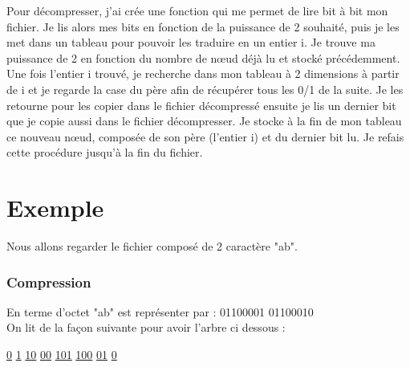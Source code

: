 \documentclass{report}
\begin{document}
Pour décompresser, j'ai crée une fonction qui me permet de lire bit à bit mon fichier. Je lis alors mes bits en fonction de la puissance de 2 souhaité, puis je les met dans un tableau pour pouvoir les traduire en un entier i. 
Je trouve ma puissance de 2 en fonction du nombre de nœud déjà lu et stocké précédemment.
Une fois l'entier i  trouvé, je recherche dans mon tableau à 2 dimensions à partir de i et je regarde la case du père afin de récupérer tous les 0/1 de la suite. Je les retourne pour les copier dans le fichier décompressé ensuite je lis un dernier bit que je copie aussi dans le fichier décompresser.
Je stocke à la fin de mon tableau ce nouveau nœud, composée de son père (l'entier i) et du dernier bit lu. 
Je refais cette procédure jusqu'à la fin du fichier. 

 
\section*{Exemple}
Nous allons regarder le fichier composé de 2 caractère "ab".

\subsubsection{Compression}
En terme d'octet "ab" est représenter par : 
		01100001 01100010\\
On lit de la façon suivante pour avoir l'arbre ci dessous :\begin{center}

\underline{0} \underline{1} \underline{10} \underline{00} \underline{101}  \underline{100} \underline{01} \underline{0}
\\
\end{center}

\begin{center}
\end{center}	
\end{document}
